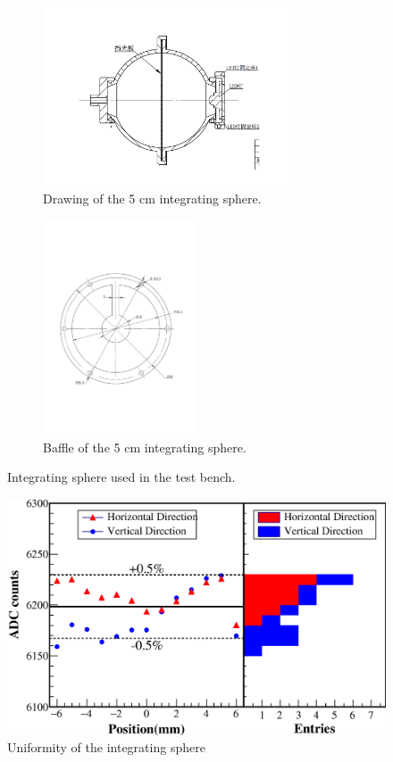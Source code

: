 \documentclass[]{article}
\begin{document}
\begin{figure}[!htb]
	\begin{subfigure}[t]{75mm}
		\includegraphics[width=75mm]{is_drawing}
		\caption{Drawing of the 5 cm integrating sphere.}
		\label{fig:is_drawing}
	\end{subfigure}
	\begin{subfigure}[t]{45mm}
		\includegraphics[width=45mm]{baffle}
		\caption{Baffle of the 5 cm integrating sphere.}
		\label{fig:baffle}
	\end{subfigure}
	\caption{Integrating sphere used in the test bench.}
\end{figure}

\begin{figure}[!h]
\centering
\includegraphics[width=0.7\linewidth]{uniformity_integrationsphere}
\caption{Uniformity of the integrating sphere}
\label{fig:uniformity_integrationsphere}
\end{figure}
\end{document}
